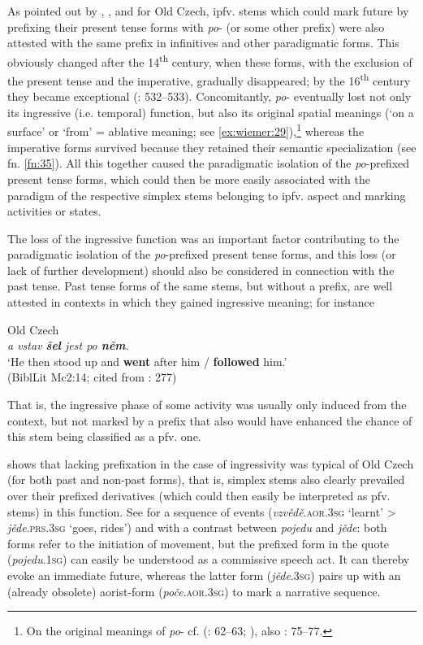 \documentclass[output=paper,colorlinks,citecolor=brown]{langscibook}
\begin{document}
As pointed out by \citet[190--191]{Trávníček1923}, \citet[529, fn. \ref{fn:9}]{Bondarko1961}, and \citet{Šlosar1981} for Old Czech, ipfv. stems which could mark future by prefixing their present tense forms with \textit{po}- (or some other prefix) were also attested with the same prefix in infinitives and other paradigmatic forms. This obviously changed after the 14\textsuperscript{th} century, when these forms, with the exclusion of the present tense and the imperative, gradually disappeared; by the 16\textsuperscript{th} century they became exceptional (\cite{Bondarko1961}: 532--533). Concomitantly, \textit{po}- eventually lost not only its ingressive (i.e. temporal) function, but also its original spatial meanings (‘on a surface’ or ‘from’ = ablative meaning; see \ref{ex:wiemer:29}),\footnote{On the original meanings of \textit{po}- cf. \citeauthor{Němec1958} (\citeyear{Němec1958}: 62--63; \citeyear{Němec2009a}), also \cite{Šlosar1981}: 75--77.} whereas the imperative forms survived because they retained their semantic specialization (see fn. \ref{fn:35}). All this together caused the paradigmatic isolation of the \textit{po}-prefixed present tense forms, which could then be more easily associated with the paradigm of the respective simplex stems belonging to ipfv. aspect and marking activities or states.

The loss of the ingressive function was an important factor contributing to the paradigmatic isolation of the \textit{po}-prefixed present tense forms, and this loss (or lack of further development) should also be considered in connection with the past tense. Past tense forms of the same stems, but without a prefix, are well attested in contexts in which they gained ingressive meaning; for instance 

\ea \label{ex:wiemer:35} Old Czech\\
    \textit{a vstav \textbf{šel} jest po \textbf{něm}.}\\
    ‘He then stood up and \textbf{went} after him / \textbf{followed} him.’\\
    \hfill (BiblLit Mc2:14; cited from \cite{Němec2009b}: 277)
\z

That is, the ingressive phase of some activity was usually only induced from the context, but not marked by a prefix that also would have enhanced the chance of this stem being classified as a pfv. one.

\citet[542--543]{Bondarko1961} shows that lacking prefixation in the case of ingressivity was typical of Old Czech (for both past and non-past forms), that is, simplex stems also clearly prevailed over their prefixed derivatives (which could then easily be interpreted as pfv. stems) in this function. See  for a sequence of events (\textit{vzvědě}.\textsc{aor.3sg} ‘learnt’ > \textit{jěde}.\textsc{prs.3sg} ‘goes, rides’) and  with a contrast between \textit{pojedu} and \textit{jěde}: both forms refer to the initiation of movement, but the prefixed form in the quote (\textit{pojedu}.\textsc{1sg}) can easily be understood as a commissive speech act. It can thereby evoke an immediate future, whereas the latter form (\textit{jěde}.\textsc{3sg}) pairs up with an (already obsolete) aorist-form (\textit{poče}.\textsc{aor.3sg}) to mark a narrative sequence.
\end{document}
